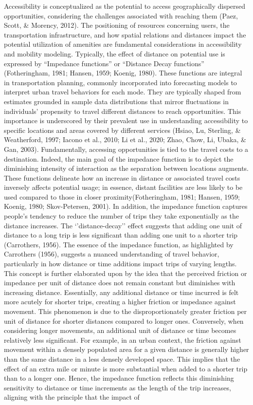 \documentclass[
11pt, %
oneside, %
english, %
singlespacing, %
]{macthesis} %
\begin{document}
Accessibility is conceptualized as the potential to access geographically dispersed opportunities, considering the challenges associated with reaching them (Paez, Scott, \& Morency, 2012). The positioning of resources concerning users, the transportation infrastructure, and how spatial relations and distances impact the potential utilization of amenities are fundamental considerations in accessibility and mobility modeling. Typically, the effect of distance on potential use is expressed by ``Impedance functions'' or ``Distance Decay functions'' (Fotheringham, 1981; Hansen, 1959; Koenig, 1980). These functions are integral in transportation planning, commonly incorporated into forecasting models to interpret urban travel behaviors for each mode. They are typically shaped from estimates grounded in sample data distributions that mirror fluctuations in individuals' propensity to travel different distances to reach opportunities. This importance is underscored by their prevalent use in understanding accessibility to specific locations and areas covered by different services (Hsiao, Lu, Sterling, \& Weatherford, 1997; Iacono et al., 2010; Li et al., 2020; Zhao, Chow, Li, Ubaka, \& Gan, 2003). Fundamentally, accessing opportunities is tied to the travel costs to a destination. Indeed, the main goal of the impedance function is to depict the diminishing intensity of interaction as the separation between locations augments. These functions delineate how an increase in distance or associated travel costs inversely affects potential usage; in essence, distant facilities are less likely to be used compared to those in closer proximity(Fotheringham, 1981; Hansen, 1959; Koenig, 1980; Skov-Petersen, 2001). In addition, the impedance function captures people's tendency to reduce the number of trips they take exponentially as the distance increases. The `'distance-decay'' effect suggests that adding one unit of distance to a long trip is less significant than adding one unit to a shorter trip (Carrothers, 1956). The essence of the impedance function, as highlighted by Carrothers (1956), suggests a nuanced understanding of travel behavior, particularly in how distance or time additions impact trips of varying lengths. This concept is further elaborated upon by the idea that the perceived friction or impedance per unit of distance does not remain constant but diminishes with increasing distance. Essentially, any additional distance or time incurred is felt more acutely for shorter trips, creating a higher friction or impedance against movement. This phenomenon is due to the disproportionately greater friction per unit of distance for shorter distances compared to longer ones. Conversely, when considering longer movements, an additional unit of distance or time becomes relatively less significant. For example, in an urban context, the friction against movement within a densely populated area for a given distance is generally higher than the same distance in a less densely developed space. This implies that the effect of an extra mile or minute is more substantial when added to a shorter trip than to a longer one. Hence, the impedance function reflects this diminishing sensitivity to distance or time increments as the length of the trip increases, aligning with the principle that the impact of 
\end{document}
